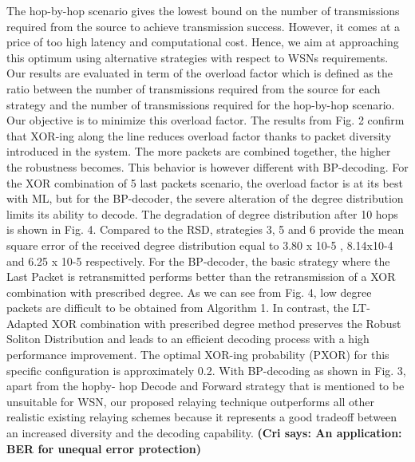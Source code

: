 \documentclass[12pt,a4paper,titlepage,twocolumn]{article}
\newcommand{\cri}[1]{\textcolor{MyColor2}{\textbf{(Cri says: #1)}}}
\begin{document}
The hop-by-hop scenario gives the lowest bound on the
number of transmissions required from the source to achieve
transmission success. However, it comes at a price of too high
latency and computational cost. Hence, we aim at approaching
this optimum using alternative strategies with respect to WSNs
requirements. Our results are evaluated in term of the overload
factor which is defined as the ratio between the number
of transmissions required from the source for each strategy
and the number of transmissions required for the hop-by-hop
scenario. Our objective is to minimize this overload factor.
The results from Fig. 2 confirm that XOR-ing along the line
reduces overload factor thanks to packet diversity introduced
in the system. The more packets are combined together, the
higher the robustness becomes. This behavior is however
different with BP-decoding. For the XOR combination of 5 last
packets scenario, the overload factor is at its best with ML,
but for the BP-decoder, the severe alteration of the degree
distribution limits its ability to decode. The degradation of
degree distribution after 10 hops is shown in Fig. 4. Compared
to the RSD, strategies 3, 5 and 6 provide the mean square
error of the received degree distribution equal to 3.80 x 10-5 ,
8.14x10-4 and 6.25 x 10-5 respectively.
For the BP-decoder, the basic strategy where the Last Packet
is retransmitted performs better than the retransmission of a
XOR combination with prescribed degree. As we can see from
Fig. 4, low degree packets are difficult to be obtained from
Algorithm 1. In contrast, the LT-Adapted XOR combination
with prescribed degree method preserves the Robust Soliton
Distribution and leads to an efficient decoding process with a
high performance improvement. The optimal XOR-ing probability
(PXOR) for this specific configuration is approximately
0.2. With BP-decoding as shown in Fig. 3, apart from the hopby-
hop Decode and Forward strategy that is mentioned to be
unsuitable for WSN, our proposed relaying technique outperforms
all other realistic existing relaying schemes because it
represents a good tradeoff between an increased diversity and
the decoding capability.
\cri{An application: BER for unequal error protection}
\end{document}
